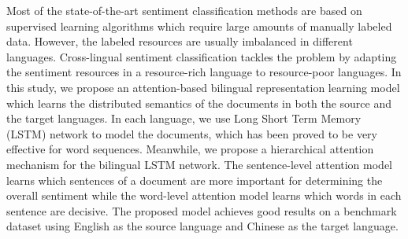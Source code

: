Most of the state-of-the-art sentiment classification methods are based on supervised learning algorithms which require large amounts of manually labeled data. However, the labeled resources are usually imbalanced in different languages. Cross-lingual sentiment classification tackles the problem by adapting the sentiment resources in a resource-rich language to resource-poor languages. In this study, we propose an attention-based bilingual representation learning model which learns the distributed semantics of the documents in both the source and the target languages. In each language, we use Long Short Term Memory (LSTM) network to model the documents, which has been proved to be very effective for word sequences. Meanwhile, we propose a hierarchical attention mechanism for the bilingual LSTM network. The sentence-level attention model learns which sentences of a document are more important for determining the overall sentiment while the word-level attention model learns which words in each sentence are decisive. The proposed model achieves good results on a benchmark dataset using English as the source language and Chinese as the target language.
